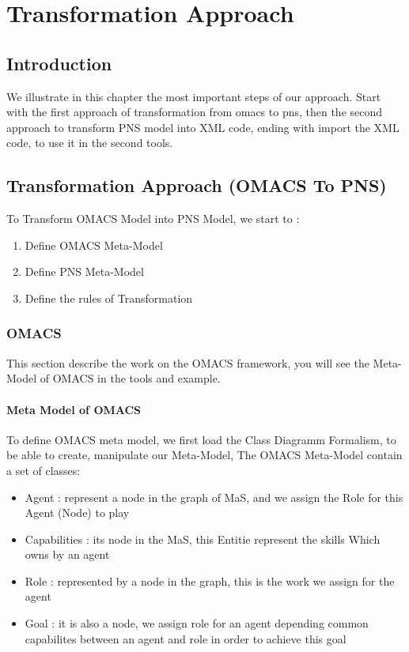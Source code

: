 
\chapter{\label{cha: Transformation Approach } Transformation Approach}
\section{Introduction}
We illustrate in this chapter the most important steps of our approach. Start with the first approach of transformation from omacs to pns, then the second approach to transform PNS model into XML code, ending with import the XML code, to use it in the second tools. 

\section{Transformation Approach (OMACS To PNS)\label{sec:OMACS into PNS} }%
To Transform OMACS Model into PNS Model, we start to :
\begin{enumerate}
\item Define OMACS Meta-Model 
\item Define PNS Meta-Model
\item Define the rules of Transformation
\end{enumerate}


\subsection{OMACS} 
This section describe the work on the OMACS framework, you will see the Meta-Model of OMACS in the tools and example. 
\subsubsection{Meta Model of OMACS}
\vspace{0.5cm}
To define OMACS meta model, we first load the Class Diagramm Formalism, to be able to create, manipulate our Meta-Model,
The OMACS Meta-Model contain a set of classes:
\pagebreak
\begin{itemize}
\newcommand{\localtextbulletone}{\textcolor{gray}{\raisebox{.45ex}{\rule{.6ex}{.6ex}}}}
\renewcommand{\labelitemi}{\localtextbulletone}
	\item Agent  : represent a node in the graph of MaS, and  we assign the Role for this Agent (Node) to play  
	\item Capabilities : its node in the MaS, this Entitie represent the skills Which owns by an agent
	\item Role : represented by a node in the graph, this is the work we assign for the agent 
	\item Goal : it is also a node, we assign role for an agent depending common capabilites between an agent and role in order to achieve this goal
\end{itemize}
 
